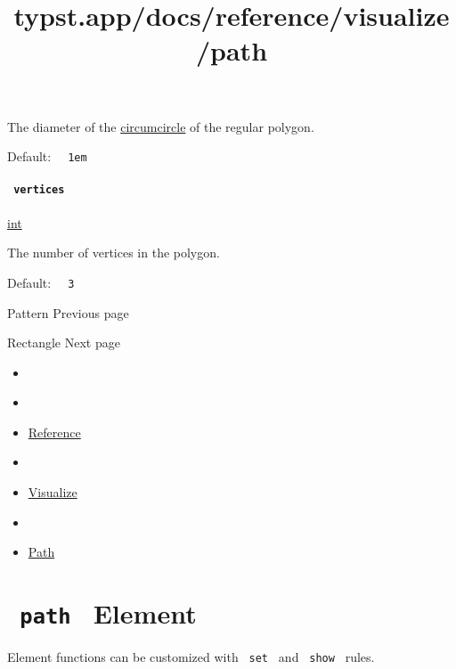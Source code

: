 The diameter of the
\href{https://en.wikipedia.org/wiki/Circumcircle}{circumcircle} of the
regular polygon.

Default: \texttt{\ }{\texttt{\ 1em\ }}\texttt{\ }

\paragraph{\texorpdfstring{\texttt{\ vertices\ }}{ vertices }}\label{definitions-regular-vertices}

\href{/docs/reference/foundations/int/}{int}

The number of vertices in the polygon.

Default: \texttt{\ }{\texttt{\ 3\ }}\texttt{\ }

\href{/docs/reference/visualize/pattern/}{\pandocbounded{}}

{ Pattern } { Previous page }

\href{/docs/reference/visualize/rect/}{\pandocbounded{}}

{ Rectangle } { Next page }


\title{typst.app/docs/reference/visualize/path}

\begin{itemize}
\tightlist
\item
  \href{/docs}{}
\item
  
\item
  \href{/docs/reference/}{Reference}
\item
  
\item
  \href{/docs/reference/visualize/}{Visualize}
\item
  
\item
  \href{/docs/reference/visualize/path/}{Path}
\end{itemize}

\section{\texorpdfstring{\texttt{\ path\ } {{ Element
}}}{ path   Element }}\label{summary}

\label{element-tooltip}
Element functions can be customized with \texttt{\ set\ } and
\texttt{\ show\ } rules.

